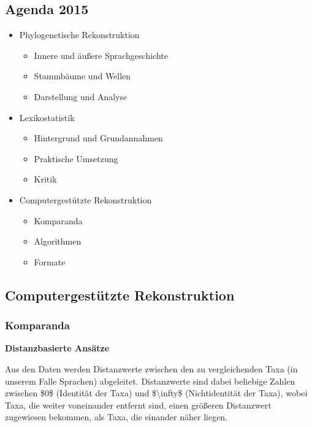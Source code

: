 \subsection{\texorpdfstring{{Agenda 2015}}{Agenda 2015}}

\begin{itemize}
\itemsep1pt\parskip0pt
\item
  {Phylogenetische Rekonstruktion}

  \begin{itemize}
  \itemsep1pt\parskip0pt
  \item
    {Innere und äußere Sprachgeschichte}
  \item
    {Stammbäume und Wellen}
  \item
    {Darstellung und Analyse}
  \end{itemize}
\item
  {Lexikostatistik}

  \begin{itemize}
  \itemsep1pt\parskip0pt
  \item
    {Hintergrund und Grundannahmen}
  \item
    {Praktische Umsetzung}
  \item
    {Kritik}
  \end{itemize}
\item
  {Computergestützte Rekonstruktion}

  \begin{itemize}
  \itemsep1pt\parskip0pt
  \item
    {Komparanda}
  \item
    {Algorithmen}
  \item
    {Formate}
  \end{itemize}
\end{itemize}

\subsection{\texorpdfstring{{Computergestützte
Rekonstruktion}}{Computergestützte Rekonstruktion}}

\subsubsection{\texorpdfstring{{Komparanda}}{Komparanda}}

\textbf{Distanzbasierte Ansätze}

Aus den Daten werden Distanzwerte zwischen den zu vergleichenden Taxa
(in unserem Falle Sprachen) abgeleitet. Distanzwerte sind dabei
beliebige Zahlen zwischen \$0\$ (Identität der Taxa) und
\$\textbackslash{}infty\$ (Nichtidentität der Taxa), wobei Taxa, die
weiter voneinander entfernt sind, einen größeren Distanzwert zugewiesen
bekommen, als Taxa, die einander näher liegen.

